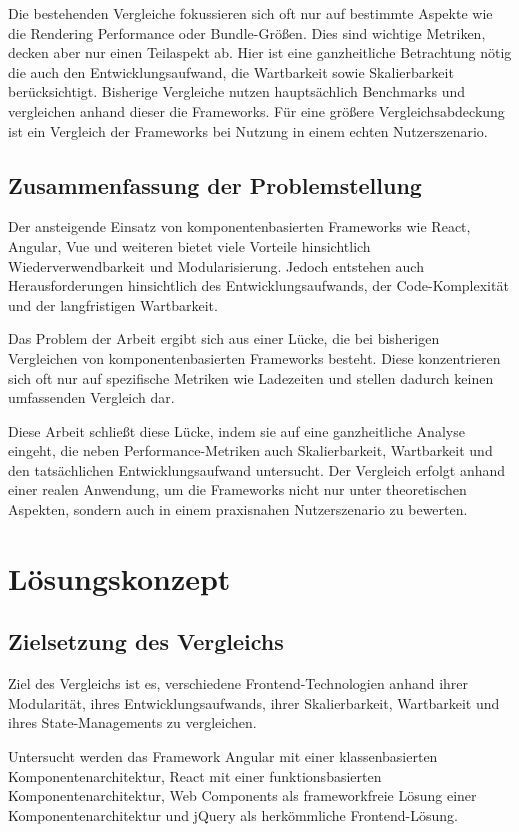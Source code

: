 \documentclass[oneside]{ausarbeitung}
\begin{document}
Die bestehenden Vergleiche fokussieren sich oft nur auf bestimmte Aspekte wie die Rendering Performance oder Bundle-Größen. Dies sind wichtige Metriken, decken aber nur einen Teilaspekt ab. Hier ist eine ganzheitliche Betrachtung nötig die auch den Entwicklungsaufwand, die Wartbarkeit sowie Skalierbarkeit berücksichtigt. Bisherige Vergleiche nutzen hauptsächlich Benchmarks und vergleichen anhand dieser die Frameworks. Für eine größere Vergleichsabdeckung ist ein Vergleich der Frameworks bei Nutzung in einem echten Nutzerszenario. 

\section{Zusammenfassung der Problemstellung}

Der ansteigende Einsatz von komponentenbasierten Frameworks wie React, Angular, Vue und weiteren bietet viele Vorteile hinsichtlich Wiederverwendbarkeit und Modularisierung. Jedoch entstehen auch Herausforderungen hinsichtlich des Entwicklungsaufwands, der Code-Komplexität und der langfristigen Wartbarkeit.

Das Problem der Arbeit ergibt sich aus einer Lücke, die bei bisherigen Vergleichen von komponentenbasierten Frameworks besteht. Diese konzentrieren sich oft nur auf spezifische Metriken wie Ladezeiten und stellen dadurch keinen umfassenden Vergleich dar.

Diese Arbeit schließt diese Lücke, indem sie auf eine ganzheitliche Analyse eingeht, die neben Performance-Metriken auch Skalierbarkeit, Wartbarkeit und den tatsächlichen Entwicklungsaufwand untersucht. Der Vergleich erfolgt anhand einer realen Anwendung, um die Frameworks nicht nur unter theoretischen Aspekten, sondern auch in einem praxisnahen Nutzerszenario zu bewerten.

\chapter{Lösungskonzept}
\label{cha:loesungskonzept}

\section{Zielsetzung des Vergleichs}
Ziel des Vergleichs ist es, verschiedene Frontend-Technologien anhand ihrer Modularität, ihres Entwicklungsaufwands, ihrer Skalierbarkeit, Wartbarkeit und ihres State-Managements zu vergleichen.

Untersucht werden das Framework Angular mit einer klassenbasierten Komponentenarchitektur, React mit einer funktionsbasierten Komponentenarchitektur, Web Components als frameworkfreie Lösung einer Komponentenarchitektur und jQuery als herkömmliche Frontend-Lösung.
\end{document}
